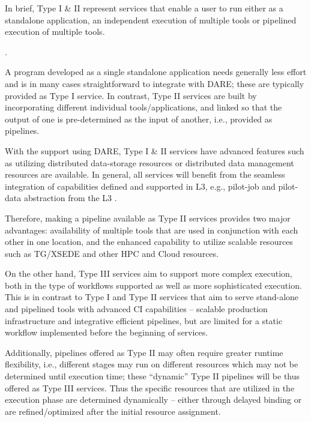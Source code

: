 \documentclass[]{svjour3}
\begin{document}
In brief, Type I \& II represent services that enable a user to run
either as a standalone application, an independent execution of
multiple tools or pipelined execution of multiple tools.

.


A program developed as a single standalone application needs generally
less effort and is in many cases straightforward to integrate with
DARE; these are typically provided as Type I service. In contrast,
Type II services are built by incorporating different individual
tools/applications, and linked so that the output of one is
pre-determined as the input of another, i.e., provided as pipelines.

With the support using DARE, Type I \& II services have advanced
features such as utilizing distributed data-storage resources or
distributed data management resources are available. In general, all
services will benefit from the seamless integration of capabilities
defined and supported in L3, e.g., pilot-job and pilot-data
abstraction from the L3 \cite{pstar11}.

Therefore, making a pipeline available as Type II services provides
two major advantages: availability of multiple tools that are used in
conjunction with each other in one location, and the enhanced
capability to utilize scalable resources such as TG/XSEDE and other
HPC and Cloud resources.

On the other hand, Type III services aim to support more complex
execution, both in the type of workflows supported as well as more
sophisticated execution. This is in contrast to Type I and Type II
services that aim to serve stand-alone and pipelined tools with
advanced CI capabilities -- scalable production infrastructure and
integrative efficient pipelines, but are limited for a static workflow
implemented before the beginning of services.

Additionally, pipelines offered as Type II may often require greater
runtime flexibility, i.e., different stages may run on different
resources which may not be determined until execution time; these
``dynamic'' Type II pipelines will be thus offered as Type III
services. Thus the specific resources that are utilized in the
execution phase are determined dynamically -- either through delayed
binding or are refined/optimized after the initial resource
assignment.
\end{document}
